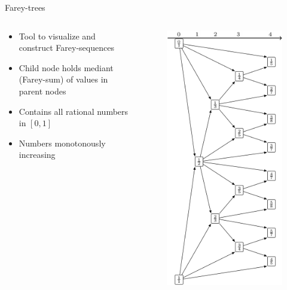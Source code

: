 \begin{frame}{Farey-trees}
	\begin{columns}
		\begin{column}{.5 \textwidth}
			\vspace{-2em}
			\begin{itemize}
				\item Tool to visualize and construct Farey-sequences
				\item Child node holds mediant (Farey-sum) of values in parent nodes
				      \pause
				      \vspace{1em}
				\item Contains all rational numbers in $[0, 1]$
				\item Numbers monotonously increasing
			\end{itemize}
			\vspace{-.7em}
		\end{column}
		\begin{column}{.5 \textwidth}
			\vspace{-5em}
			\begin{figure}
				\includegraphics[width=.47 \textwidth]{../../Report/Figures/FareyTrees/LR_RotNum/adding.png}

\end{figure}
\end{column}
\end{columns}
\end{frame}
